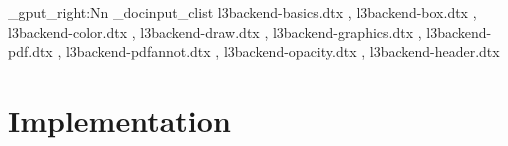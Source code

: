 \documentclass[full,kernel]{l3doc}
\begin{document}
\makeatletter
\let\DelayPrintIndex\PrintIndex
\let\PrintIndex\@empty
\makeatother

\ExplSyntaxOn
\clist_gput_right:Nn \g_docinput_clist
  {
    l3backend-basics.dtx   ,
    l3backend-box.dtx      ,
    l3backend-color.dtx    ,
    l3backend-draw.dtx     ,
    l3backend-graphics.dtx ,
    l3backend-pdf.dtx      ,
    l3backend-pdfannot.dtx ,
    l3backend-opacity.dtx  ,
    l3backend-header.dtx
  }
\ExplSyntaxOff

\part{Implementation}

\def\maketitle{}
\EnableImplementation
\DisableDocumentation
\DocInputAgain

\clearpage

\DelayPrintIndex
\end{document}
